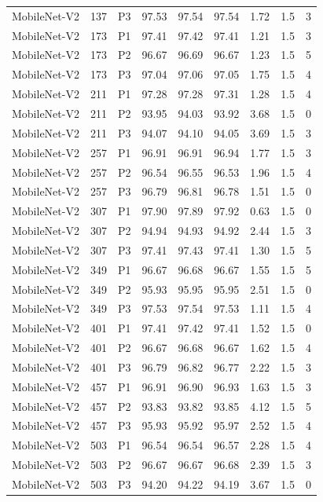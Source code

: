 {\begin{longtable}{lrlrrrrrr}
MobileNet-V2 & 137 & P3 & 97.53 & 97.54 & 97.54 & 1.72 & 1.5 & 3 \\
MobileNet-V2 & 173 & P1 & 97.41 & 97.42 & 97.41 & 1.21 & 1.5 & 3 \\
MobileNet-V2 & 173 & P2 & 96.67 & 96.69 & 96.67 & 1.23 & 1.5 & 5 \\
MobileNet-V2 & 173 & P3 & 97.04 & 97.06 & 97.05 & 1.75 & 1.5 & 4 \\
MobileNet-V2 & 211 & P1 & 97.28 & 97.28 & 97.31 & 1.28 & 1.5 & 4 \\
MobileNet-V2 & 211 & P2 & 93.95 & 94.03 & 93.92 & 3.68 & 1.5 & 0 \\
MobileNet-V2 & 211 & P3 & 94.07 & 94.10 & 94.05 & 3.69 & 1.5 & 3 \\
MobileNet-V2 & 257 & P1 & 96.91 & 96.91 & 96.94 & 1.77 & 1.5 & 3 \\
MobileNet-V2 & 257 & P2 & 96.54 & 96.55 & 96.53 & 1.96 & 1.5 & 4 \\
MobileNet-V2 & 257 & P3 & 96.79 & 96.81 & 96.78 & 1.51 & 1.5 & 0 \\
MobileNet-V2 & 307 & P1 & 97.90 & 97.89 & 97.92 & 0.63 & 1.5 & 0 \\
MobileNet-V2 & 307 & P2 & 94.94 & 94.93 & 94.92 & 2.44 & 1.5 & 3 \\
MobileNet-V2 & 307 & P3 & 97.41 & 97.43 & 97.41 & 1.30 & 1.5 & 5 \\
MobileNet-V2 & 349 & P1 & 96.67 & 96.68 & 96.67 & 1.55 & 1.5 & 5 \\
MobileNet-V2 & 349 & P2 & 95.93 & 95.95 & 95.95 & 2.51 & 1.5 & 0 \\
MobileNet-V2 & 349 & P3 & 97.53 & 97.54 & 97.53 & 1.11 & 1.5 & 4 \\
MobileNet-V2 & 401 & P1 & 97.41 & 97.42 & 97.41 & 1.52 & 1.5 & 0 \\
MobileNet-V2 & 401 & P2 & 96.67 & 96.68 & 96.67 & 1.62 & 1.5 & 4 \\
MobileNet-V2 & 401 & P3 & 96.79 & 96.82 & 96.77 & 2.22 & 1.5 & 3 \\
MobileNet-V2 & 457 & P1 & 96.91 & 96.90 & 96.93 & 1.63 & 1.5 & 3 \\
MobileNet-V2 & 457 & P2 & 93.83 & 93.82 & 93.85 & 4.12 & 1.5 & 5 \\
MobileNet-V2 & 457 & P3 & 95.93 & 95.92 & 95.97 & 2.52 & 1.5 & 4 \\
MobileNet-V2 & 503 & P1 & 96.54 & 96.54 & 96.57 & 2.28 & 1.5 & 4 \\
MobileNet-V2 & 503 & P2 & 96.67 & 96.67 & 96.68 & 2.39 & 1.5 & 3 \\
MobileNet-V2 & 503 & P3 & 94.20 & 94.22 & 94.19 & 3.67 & 1.5 & 0 \\

\end{longtable}}
